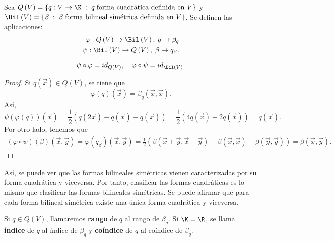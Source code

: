 Sea $\displaystyle Q\left(V\right)= \left\{ q : V \to \K \; : \; q \; \text{forma cuadrática definida en } V\right\}  $ y $\displaystyle \Bil\left(V\right) = \left\{ \beta \; : \; \beta \; \text{forma bilineal simétrica definida en } V\right\}  $. Se definen las aplicaciones:
\[
\begin{split}
 \varphi: Q\left(V\right) \to \Bil\left(V\right), \; q \to \beta _{q} \\
 \psi : \Bil\left(V\right) \to Q\left(V\right), \; \beta \to q_{\beta}.
\end{split}
\]
\begin{ftheorem}[]
\normalfont 
\[ \psi \circ \varphi = id _{Q\left(V\right)}, \quad \varphi\circ\psi = id _{\Bil\left(V\right)} .\]
\end{ftheorem}
\begin{proof}
Si $\displaystyle q\left(\vec{x}\right) \in Q\left(V\right) $, se tiene que
\[ \varphi\left(q\right) \left(\vec{x}\right) = \beta_{q}\left(\vec{x}, \vec{x}\right) .\]
Así, 
\[\psi\left(\varphi\left(q\right)\right)\left(\vec{x}\right) = \frac{1}{2}\left(q\left(2\vec{x}\right)-q\left(\vec{x}\right)-q\left(\vec{x}\right)\right) = \frac{1}{2}\left(4q\left(\vec{x}\right)-2q\left(\vec{x}\right)\right) = q\left(\vec{x}\right) .\]
Por otro lado, tenemos que 
\[
\begin{split}
	\left(\varphi\circ\psi\right)\left(\beta \right)\left(\vec{x}, \vec{y}\right) =  \varphi\left(q_{\beta }\right)\left(\vec{x}, \vec{y}\right)=\frac{1}{2}\left(\beta\left(\vec{x}+\vec{y},\vec{x}+\vec{y}\right)-\beta\left(\vec{x}, \vec{x}\right)-\beta\left(\vec{y}, \vec{y}\right)\right) 
	=  \beta\left(\vec{x}, \vec{y}\right).
\end{split}
\]
\end{proof}
\begin{observation}
\normalfont Así, se puede ver que las formas bilineales simétricas vienen caracterizadas por su forma cuadrática y viceversa. Por tanto, clasificar las formas cuadráticas es lo mismo que clasificar las formas bilineales simétricas. Se puede afirmar que para cada forma bilineal simétrica existe una única forma cuadrática y viceversa.
\end{observation}
\begin{fdefinition}[]
\normalfont Si $\displaystyle q \in Q\left(V\right) $, llamaremos \textbf{rango} de $\displaystyle q $ al rango de $\displaystyle \beta_{q} $. Si $\displaystyle \K = \R $, se llama \textbf{índice} de $\displaystyle q $ al índice de $\displaystyle \beta_{q} $ y \textbf{coíndice} de $\displaystyle q $ al coíndice de $\displaystyle \beta_{q} $.
\end{fdefinition}
